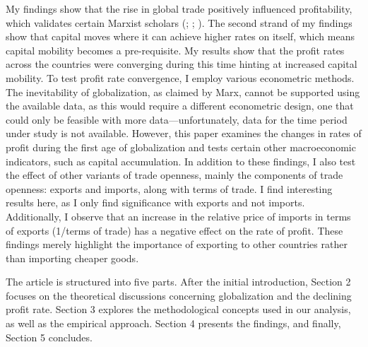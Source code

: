 \documentclass[10pt]{article}
\begin{document}
\par My findings show that the rise in global trade positively influenced profitability, which validates certain Marxist scholars (\citet{JellissenGottheil2009}; \citet{Moseley1991}; \citet{Mandel1962}). The second strand of my findings show that capital moves where it can achieve higher rates on itself, which means capital mobility becomes a pre-requisite. My results show that the profit rates across the countries were converging during this time hinting at increased capital mobility. To test profit rate convergence, I employ various econometric methods. The inevitability of globalization, as claimed by Marx, cannot be supported using the available data, as this would require a different econometric design, one that could only be feasible with more data—unfortunately, data for the time period under study is not available. However, this paper examines the changes in rates of profit during the first age of globalization and tests certain other macroeconomic indicators, such as capital accumulation. In addition to these findings, I also test the effect of other variants of trade openness, mainly the components of trade openness: exports and imports, along with terms of trade. I find interesting results here, as I only find significance with exports and not imports. Additionally, I observe that an increase in the relative price of imports in terms of exports (1/terms of trade) has a negative effect on the rate of profit. These findings merely highlight the importance of exporting to other countries rather than importing cheaper goods.
\par The article is structured into five parts. After the initial introduction, Section 2 focuses on the theoretical discussions concerning globalization and the declining profit rate. Section 3 explores the methodological concepts used in our analysis, as well as the empirical approach. Section 4 presents the findings, and finally, Section 5 concludes.
\end{document}
